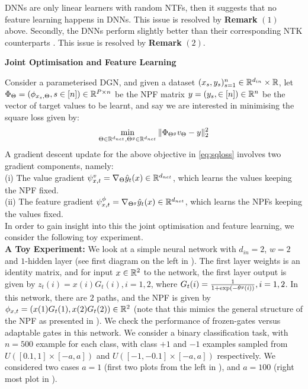 DNNs are only linear learners with random NTFs, then it suggests that no feature learning happens in DNNs. This issue is resolved by \textbf{Remark} $(1)$ above. Secondly, the DNNs perform slightly better than their corresponding NTK counterparts \cite{arora2019exact,lee2017deep}. This issue is resolved by \textbf{Remark} $(2)$.
\begin{center}
\textbf{Joint Optimisation and Feature Learning}
\end{center}
Consider a parameterised DGN, and given a dataset $(x_s,y_s)_{s=1}^n\in \mathbb{R}^{d_{in}}\times \mathbb{R}$, let $\Phi_{\Theta}=(\phi_{x_s,\Theta},s\in[n] )\in \mathbb{R}^{P\times n}$ be the NPF matrix  $y=(y_s,\in[n])\in\mathbb{R}^n$ be the vector of target values to be learnt, and say we are interested in minimising the square loss given by:
\begin{align}\label{eq:sqloss}
\min_{\Theta\in \mathbb{R}^{d_{net}}, {\Theta}^g\in \mathbb{R}^{d_{net}}}\|\Phi_{{\Theta}^g}v_{\Theta}-y\|^2_2
\end{align}
A gradient descent update for the above objective in \eqref{eq:sqloss} involves two gradient components, namely: \\
(i) The value gradient $\psi^v_{x,t}=\nabla_{\Theta} \hat{y}_t(x)\in\mathbb{R}^{d_{net}}$, which learns the values keeping the NPF fixed.\\
(ii) The feature gradient $\psi^{\phi}_{x,t}=\nabla_{{\Theta}^g} \hat{y}_t(x)\in\mathbb{R}^{d_{net}}$, which learns the NPFs keeping the values fixed.\\
In order to gain insight into this the joint optimisation and feature learning, we consider the following toy experiment.\\
\textbf{A Toy Experiment:} We look at a simple neural network with $d_{in}=2$, $w=2$ and $1$-hidden layer (see first diagram on the left in ). The first layer weights is an identity matrix, and for input $x\in\mathbb{R}^2$ to the network, the first layer output is given by $z_{t}(i)=x(i)G_t(i),i=1,2$, where $G_t(i)=\frac{1}{1+\exp(-\theta^g(i))},i=1,2$. In this network, there are $2$ paths, and the NPF is given by $\phi_{x,t}=(x(1)G_t(1),x(2)G_t(2))\in \mathbb{R}^2$ (note that this mimics the general structure of the NPF as presented in ).
We check the performance of frozen-gates versus adaptable gates in this network. We consider a binary classification task, with $n=500$ example for each class, with class $+1$ and $-1$ examples sampled from $U([0.1,1]\times [-a,a])$ and $U([-1,-0.1]\times[-a,a])$ respectively. We considered two cases $a=1$ (first two plots from the left in ), and $a=100$ (right most plot in ). 
